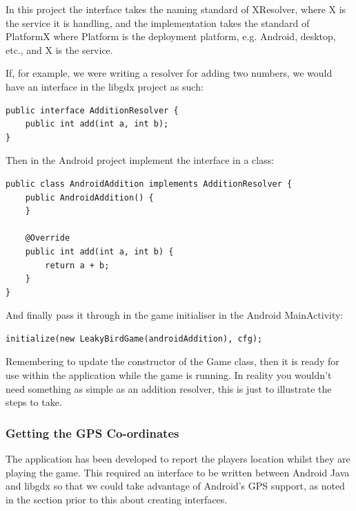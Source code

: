 In this project the interface takes the naming standard of XResolver, where X is the service it is handling, and the implementation takes the standard of PlatformX where Platform is the deployment platform, e.g. Android, desktop, etc., and X is the service.

If, for example, we were writing a resolver for adding two numbers, we would have an interface in the libgdx project as such:
\begin{verbatim}
public interface AdditionResolver {
    public int add(int a, int b);
}
\end{verbatim}
Then in the Android project implement the interface in a class:
\begin{verbatim}
public class AndroidAddition implements AdditionResolver {
    public AndroidAddition() {
    }

    @Override
    public int add(int a, int b) {
        return a + b;
    }
}
\end{verbatim}
And finally pass it through in the game initialiser in the Android MainActivity:
\begin{verbatim}
initialize(new LeakyBirdGame(androidAddition), cfg);
\end{verbatim}
Remembering to update the constructor of the Game class, then it is ready for use within the application while the game is running. In reality you wouldn’t need something as simple as an addition resolver, this is just to illustrate the steps to take.

\subsubsection{Getting the GPS Co-ordinates}
The application has been developed to report the players location whilst they are playing the game. This required an interface to be written between Android Java and libgdx so that we could take advantage of Android’s GPS support, as noted in the section prior to this about creating interfaces.

